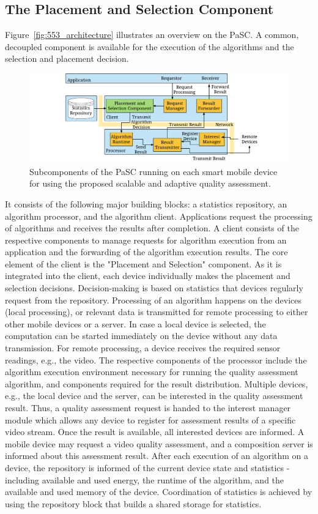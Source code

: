 \subsection{The Placement and Selection Component}
\label{sec:555_architecture}
Figure~\ref{fig:553_architecture} illustrates an overview on the \ac{PaSC}.
A common, decoupled component is available for the execution of the algorithms and the selection and placement decision.
\begin{figure}[!htb]
	\centering
	\includegraphics[width=\linewidth]{./gfx/550_QA/PASC_architecture}
	\caption[Subcomponents of the \ac{PaSC} running on each smart mobile device.]{Subcomponents of the \ac{PaSC} running on each smart mobile device for using the proposed scalable and adaptive quality assessment.}
	\label{fig:555_architecture}
\end{figure}
It consists of the following major building blocks: a statistics repository, an algorithm processor, and the algorithm client. Applications request the processing of algorithms and receives the results after completion. A client consists of the respective components to manage requests for algorithm execution from an application and the forwarding of the algorithm execution results. The core element of the client is the "Placement and Selection" component. As it is integrated into the client, each device individually makes the placement and selection decisions. Decision-making is based on statistics that devices regularly request from the repository. Processing of an algorithm happens on the devices (local processing), or relevant data is transmitted for remote processing to either other mobile devices or a server. In case a local device is selected, the computation can be started immediately on the device without any data transmission. 
For remote processing, a device receives the required sensor readings, e.g., the video. 
The respective components of the processor include the algorithm execution environment necessary for running the quality assessment algorithm, and components required for the result distribution.
Multiple devices, e.g., the local device and the server, can be interested in the quality assessment result.
Thus, a quality assessment request is handed to the interest manager module which allows any device to register for assessment results of a specific video stream. 
Once the result is available, all interested devices are informed.
 A mobile device may request a video quality assessment, and a composition server is informed about this assessment result.
After each execution of an algorithm on a device, the repository is informed of the current device state and statistics - including available and used energy, the runtime of the algorithm, and the available and used memory of the device. Coordination of statistics is achieved by using the repository block that builds a shared storage for statistics. 

